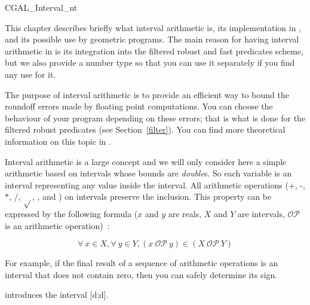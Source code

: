 
\begin{ccClass} {CGAL_Interval_nt}
\label{interval}

This chapter describes briefly what interval arithmetic is, its implementation
in {\cgal}, and its possible use by geometric programs.
The main reason for having interval arithmetic in {\cgal} is its integration
into the filtered robust and fast predicates scheme, but we also provide a
number type so that you can use it separately if you find any use for it.


The purpose of interval arithmetic is to provide an efficient way to bound
the roundoff errors made by floating point computations.
You can choose the behaviour of your program depending on these errors; that
is what is done for the filtered robust predicates (see Section~\ref{filter}).
You can find more theoretical information on this topic in
\cite{bbp-iayed-98scg}.

\ccDefinition
Interval arithmetic is a large concept and we will only consider here a 
simple arithmetic based on intervals whose bounds are {\it double}s.
So each variable is an interval representing any value inside the interval.
All arithmetic operations (+, -, $*$, $/$, $\sqrt{}$, ,
 and ) on intervals preserve the inclusion.
This property can be expressed by the following formula ($x$ and $y$ are
reals, $X$ and $Y$ are intervals, $\mathcal{OP}$ is an arithmetic operation)~:

$$
\forall\ x \in X, \forall\ y \in Y, (x\ \mathcal{OP}\ y)
\in (X\ \mathcal{OP}\ Y)
$$

For example, if the final result of a sequence of arithmetic operations is
an interval that does not contain zero, then you can safely determine its sign.


\ccCreation

{introduces the interval [d;d].}


\end{ccClass}
